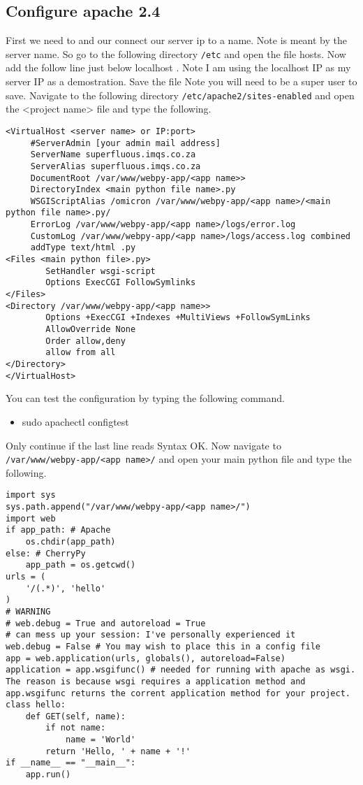 \documentclass[a4paper]{article}
\begin{document}
\subsection{Configure apache 2.4}
First we need to and our connect our server ip to a name. Note  is meant by the server name. So go to the following directory \verb#/etc# and open the file hosts. Now add the follow line just below localhost . Note I am using the localhost IP as my server IP as a demostration.
Save the file Note you will need to be a super user to save.
Navigate to the following directory \verb#/etc/apache2/sites-enabled# and open the <project name> file and type the following.
\begin{verbatim}
<VirtualHost <server name> or IP:port>
     #ServerAdmin [your admin mail address]
     ServerName superfluous.imqs.co.za
     ServerAlias superfluous.imqs.co.za
     DocumentRoot /var/www/webpy-app/<app name>>
     DirectoryIndex <main python file name>.py
     WSGIScriptAlias /omicron /var/www/webpy-app/<app name>/<main python file name>.py/
     ErrorLog /var/www/webpy-app/<app name>/logs/error.log
     CustomLog /var/www/webpy-app/<app name>/logs/access.log combined
     addType text/html .py
<Files <main python file>.py>
        SetHandler wsgi-script
        Options ExecCGI FollowSymlinks
</Files>
<Directory /var/www/webpy-app/<app name>>
        Options +ExecCGI +Indexes +MultiViews +FollowSymLinks
        AllowOverride None
        Order allow,deny
        allow from all
</Directory>
</VirtualHost>
\end{verbatim}
You can test the configuration by typing the following command.
\begin{itemize}
\item sudo apachectl configtest
\end{itemize}
Only continue if the last line reads Syntax OK.
Now navigate to \verb#/var/www/webpy-app/<app name>/# and open your main python file and type the following.
\begin{verbatim}
import sys
sys.path.append("/var/www/webpy-app/<app name>/")
import web
if app_path: # Apache
    os.chdir(app_path)
else: # CherryPy
    app_path = os.getcwd()
urls = (
    '/(.*)', 'hello'
)
# WARNING
# web.debug = True and autoreload = True
# can mess up your session: I've personally experienced it
web.debug = False # You may wish to place this in a config file
app = web.application(urls, globals(), autoreload=False)
application = app.wsgifunc() # needed for running with apache as wsgi. The reason is because wsgi requires a application method and app.wsgifunc returns the corrent application method for your project.
class hello:
    def GET(self, name):
        if not name:
            name = 'World'
        return 'Hello, ' + name + '!'
if __name__ == "__main__":
    app.run()
\end{verbatim}
\end{document}

